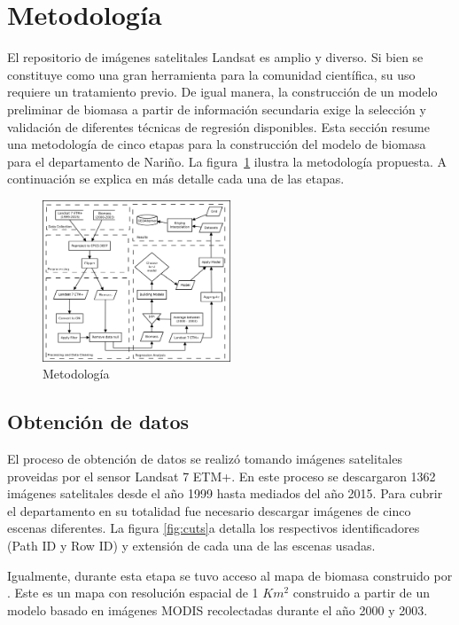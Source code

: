 
\section{Metodología}
El repositorio de imágenes satelitales Landsat es amplio y diverso.  Si bien se constituye como una gran herramienta para la comunidad científica, su uso requiere un tratamiento previo.  De igual manera, la construcción de un modelo preliminar de biomasa a partir de información secundaria exige la selección y validación de diferentes técnicas de regresión disponibles.  Esta sección resume una metodología de cinco etapas para la construcción del modelo de biomasa para el departamento de Nariño.  La figura~\ref{fig:metodology} ilustra la metodología propuesta. A continuación se explica en más detalle cada una de las etapas.

\begin{figure}
  \centering
  \includegraphics[width = 0.5\textwidth]{metodology.png}
  \caption{Metodología}
  \label{fig:metodology}
\end{figure}

\subsection{Obtención de datos}

El proceso de obtención de datos se realizó tomando imágenes satelitales proveidas por el sensor Landsat 7 ETM+. En este proceso se descargaron 1362 imágenes satelitales desde el año 1999 hasta mediados del año 2015. Para cubrir el departamento en su totalidad fue necesario descargar imágenes de cinco escenas diferentes.  La figura \ref{fig:cuts}a detalla los respectivos identificadores (Path ID y Row ID) y extensión de cada una de las escenas usadas.

Igualmente, durante esta etapa se tuvo acceso al mapa de biomasa construido por \cite{baccini2008afirst}.  Este es un mapa con resolución espacial de 1 $Km^2$ construido a partir de un modelo basado en imágenes MODIS recolectadas durante el año 2000 y 2003.

